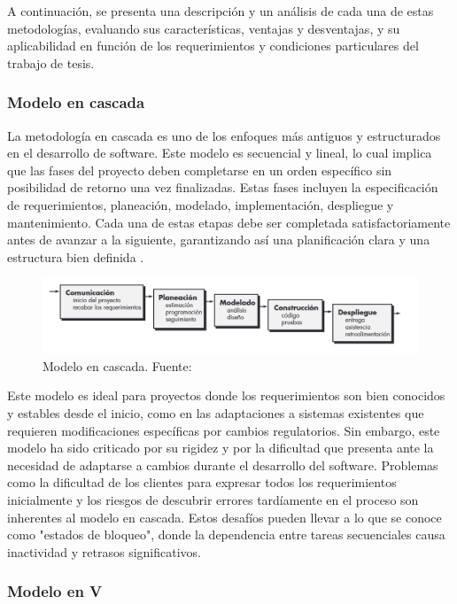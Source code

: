 \documentclass[main.tex]{subfiles}
\begin{document}
A continuación, se presenta una descripción y un análisis de cada una de estas metodologías, evaluando sus características, ventajas y desventajas, y su aplicabilidad en función de los requerimientos y condiciones particulares del trabajo de tesis.


\subsubsection{Modelo en cascada}

La metodología en cascada es uno de los enfoques más antiguos y estructurados en el desarrollo de software. Este modelo es secuencial y lineal, lo cual implica que las fases del proyecto deben completarse en un orden específico sin posibilidad de retorno una vez finalizadas. Estas fases incluyen la especificación de requerimientos, planeación, modelado, implementación, despliegue y mantenimiento. Cada una de estas etapas debe ser completada satisfactoriamente antes de avanzar a la siguiente, garantizando así una planificación clara y una estructura bien definida \cite{pressman2010ingeneria}.

\begin{figure}[h]
    \centering
    \includegraphics[width=\linewidth]{./assets/model-waterfall.png}
    \caption{Modelo en cascada. Fuente: \cite{pressman2010ingeneria}}
\end{figure}

Este modelo es ideal para proyectos donde los requerimientos son bien conocidos y estables desde el inicio, como en las adaptaciones a sistemas existentes que requieren modificaciones específicas por cambios regulatorios. Sin embargo, este modelo ha sido criticado por su rigidez y por la dificultad que presenta ante la necesidad de adaptarse a cambios durante el desarrollo del software. Problemas como la dificultad de los clientes para expresar todos los requerimientos inicialmente y los riesgos de descubrir errores tardíamente en el proceso son inherentes al modelo en cascada. Estos desafíos pueden llevar a lo que se conoce como "estados de bloqueo", donde la dependencia entre tareas secuenciales causa inactividad y retrasos significativos.

\subsubsection{Modelo en V}
\end{document}
